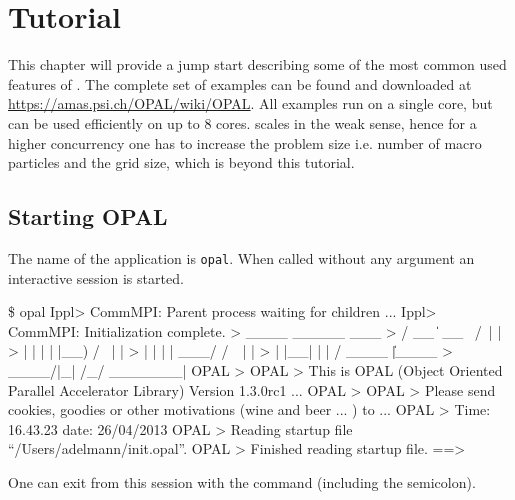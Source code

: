

\chapter{Tutorial}
\label{chp:tutorial}
This chapter will provide a jump start describing some of the most common used features of \opal. The complete set of examples can be found
and downloaded at \url{https://amas.psi.ch/OPAL/wiki/OPAL}. All examples run on a single core, but can be used
efficiently on up to 8 cores. \opal scales in the weak sense, hence for a higher concurrency one has to increase the problem size i.e. number of
macro particles and the grid size, which is beyond this tutorial.

\section{Starting OPAL}
The name of the application is \texttt{opal}. When called without any argument an interactive session is started.
\begin{example}
\$ opal
Ippl> CommMPI: Parent process waiting for children ...
Ippl> CommMPI: Initialization complete.
>                ____  _____       ___
>               / __ \|  __ \ /\   | |
>              | |  | | |__) /  \  | |
>              | |  | |  ___/ /\ \ | |
>              | |__| | |  / ____ \| |____
>               \____/|_| /_/    \_\______|
OPAL >
OPAL > This is OPAL (Object Oriented Parallel Accelerator Library) Version 1.3.0rc1 ...
OPAL >
OPAL > Please send cookies, goodies or other motivations (wine and beer ... ) to ...
OPAL > Time: 16.43.23 date: 26/04/2013
OPAL > Reading startup file ``/Users/adelmann/init.opal''.
OPAL > Finished reading startup file.
==>
\end{example}
One can exit from this session with the command  (including the semicolon).

